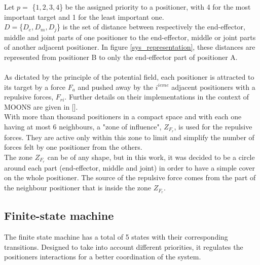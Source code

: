 \documentclass[]{spie}  %
\begin{document}
	Let $p =$ \{$1,2,3,4$\} be the assigned priority to a positioner, with 4 for the most important target and 1 for the least important one. \\
	$D=$\{$D_e, D_m, D_j$\} is the set of distance between respectively the end-effector, middle and joint parts of one positioner to the  end-effector, middle or joint parts of another adjacent positioner. In figure \ref{sys_representation}, these distances are represented from positioner B to only the end-effector part of positioner A.\\\\
	As dictated by the principle of the potential field, each positioner is attracted to its target by a force $F_a$ and pushed away by the $i^{ieme}$ adjacent positioners with a repulsive forces, $F_{ri}$. Further details on their implementations in the context of MOONS are given in []. \\
	 With more than thousand positioners in a compact space and with each one having at most 6 neighbours, a "zone of influence", $Z_{F_{r}}$, is used for the repulsive forces. They are active only within this zone to limit and simplify the number of forces felt by one positioner from the others.\\ 
	 The zone $Z_{F_{r}}$ can be of any shape, but in this work, it was decided to be a circle around each part (end-effector, middle and joint) in order to have a simple cover on the whole positioner. The source of the repulsive force comes from the part of the neighbour positioner that is inside the zone $Z_{F_{r}}$.
	 
	\subsection{Finite-state machine}	
	
	The finite state machine has a total of 5 states with their corresponding transitions. Designed to take into account different priorities, it regulates the positioners interactions for a better coordination of the system.
\end{document}
